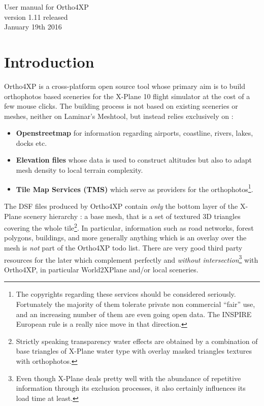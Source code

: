 \documentclass[12pt]{article}
\begin{document}
\begin{center}
\Huge User manual for Ortho4XP\\
\large version 1.11 released\\
\Large January 19th 2016
\end{center}

\tableofcontents

\section{Introduction}
Ortho4XP is a cross-platform open source tool whose primary aim is to build orthophotos based sceneries for the X-Plane 10 flight simulator at the cost of a few mouse clicks. The building process is not based on existing sceneries or meshes, neither on Laminar's Meshtool, but instead relies exclusively on :
\begin{itemize}
  \item {\bf Openstreetmap} for information regarding airports, coastline, rivers, lakes, docks etc.
  \item {\bf Elevation files} whose data is used to construct altitudes but also to adapt mesh density to local terrain complexity.
  \item {\bf Tile Map Services (TMS)} which serve as providers for the orthophotos\footnote{The copyrights regarding these services should be considered seriously. Fortunately the majority of them tolerate private non commercial ``fair'' use, and an increasing number of them are even going open data. The INSPIRE European rule is a really nice move in that direction.}.
\end{itemize}

The DSF files produced by Ortho4XP contain {\it only} the bottom layer of the X-Plane scenery hierarchy : a base mesh, that is a set of textured 3D triangles covering the whole tile\footnote{Strictly speaking transparency water effects are obtained by a combination of base triangles of X-Plane water type with overlay masked triangles textures with orthophotos.}.
In particular, information such as road networks, forest polygons, buildings, and more generally anything which is an overlay over the mesh is {\it not} part of the Ortho4XP todo list.
There are very good third party resources for the later which complement perfectly and {\it without intersection}\footnote{Even though X-Plane deals pretty well with the abundance of repetitive information through its exclusion processes, it also certainly influences its load time at least.} with Ortho4XP, in particular World2XPlane and/or local sceneries.
\end{document}
